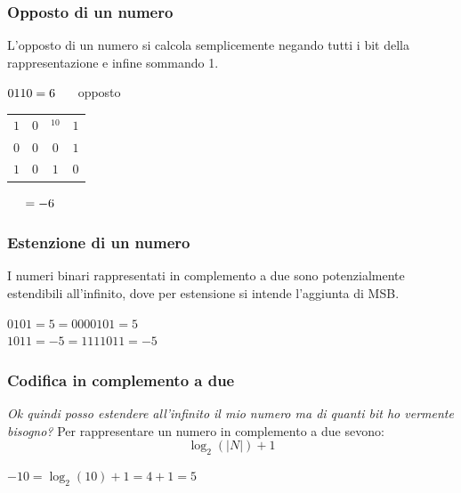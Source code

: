 \subsubsection*{Opposto di un numero}
L'opposto di un numero si calcola semplicemente negando tutti i bit della rappresentazione e infine sommando 1.
\begin{center}$0110 = 6\hspace{0,5cm}$ opposto \begin{tabular}{c c c c}\centering
     $1$&$0$&$^10$&$1$\\
     $0$&$0$&$0$&$1$\\\hline
     $1$&$0$&$1$&$0$\\
\end{tabular} $\hspace{0,5cm}= -6$\end{center}

\subsubsection*{Estenzione di un numero}
I numeri binari rappresentati in complemento a due sono potenzialmente estendibili all'infinito, dove per estensione si intende l'aggiunta di MSB.
\begin{center}
    $0101 = 5 = 0000101 = 5$\\
    $1011 = -5 = 1111011 = -5$
\end{center}

\subsubsection*{Codifica in complemento a due}
\textit{Ok quindi posso estendere all'infinito il mio numero ma di quanti bit ho vermente bisogno?} Per rappresentare un numero in complemento a due sevono:
\begin{equation}
    \log_2 (|N|)+1
\end{equation}
\begin{center}
    $-10 = \log_2 (10)+1 = 4+1 = 5$
\end{center}

